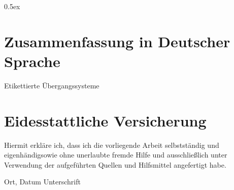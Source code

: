 \documentclass[11pt,a4paper]{book}
\begin{document}
\parindent 0pt\parskip 0.5ex



















\appendix




\newpage\null\thispagestyle{empty}\newpage

\chapter*{Zusammenfassung in Deutscher Sprache}

Etikettierte Übergangssysteme


\thispagestyle{empty}
\newpage\null\thispagestyle{empty}\newpage

\chapter*{Eidesstattliche Versicherung}

Hiermit erkläre ich, dass ich die vorliegende Arbeit selbstständig und eigenhändigsowie ohne unerlaubte fremde Hilfe und ausschließlich unter Verwendung der aufgeführten Quellen und Hilfsmittel angefertigt habe.

\vspace{4cm}

\hspace{2cm} Ort, Datum \hfill Unterschrift \hspace{2cm}


\thispagestyle{empty}
\end{document}
